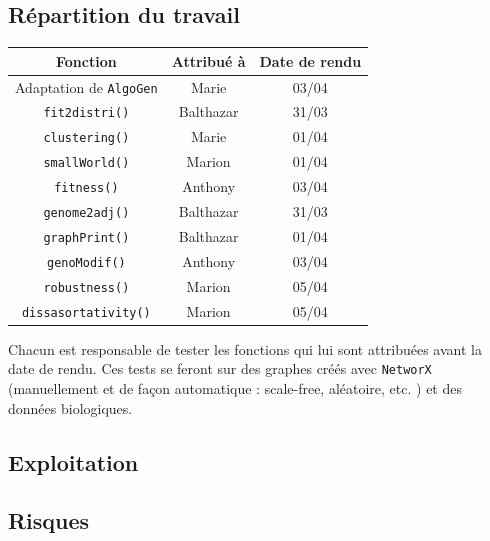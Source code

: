 \subsection{Répartition du travail}

\begin{center}
\begin{table}[!h]
\begin{tabular}{|c|c|c|}
\hline Fonction & Attribué à & Date de rendu \\
\hline
Adaptation de \verb?AlgoGen? & Marie & 03/04 \\
\hline
\verb?fit2distri()? & Balthazar & 31/03 \\
\hline
\verb?clustering()? & Marie & 01/04\\
\hline 
\verb?smallWorld()? & Marion & 01/04\\
\hline
\verb?fitness()? & Anthony & 03/04\\
\hline 
\verb?genome2adj()? & Balthazar & 31/03 \\
\hline 
\verb?graphPrint()? & Balthazar & 01/04 \\
\hline 
\verb?genoModif()? & Anthony & 03/04 \\
\hline 
\verb?robustness()? & Marion & 05/04 \\
\hline 
\verb?dissasortativity()? & Marion & 05/04\\
\hline 
\end{tabular}
\end{table}
\end{center}

Chacun est responsable de tester les fonctions qui lui sont attribuées avant la date de rendu. Ces tests se feront sur des graphes créés avec \verb?NetworX? (manuellement et de façon automatique : scale-free, aléatoire, etc. ) et des données biologiques.

\subsection{Exploitation}

\subsection{Risques}


